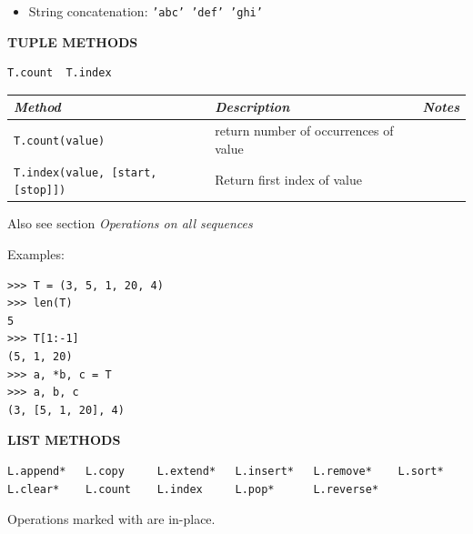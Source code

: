 \documentclass[9pt,a4wide]{extarticle}
\begin{document}
\medskip

\begin{itemize}
\item String concatenation: {\tt 'abc' 'def' 'ghi'}
\end{itemize}




\bigskip
{\LARGE\bf TUPLE METHODS}

\begin{verbatim}
T.count  T.index 
\end{verbatim}

\begin{supertabular}{|l|p{9cm}|c|}\hline
{\em Method}  & {\em Description}     &  {\em Notes}       \\ \hline\hline

{\tt T.count(value)}  &  return number of occurrences of value          &                \\ \hline

{\tt T.index(value, [start, [stop]])}  &  Return first index of value   &    \\ \hline

\end{supertabular}

\bigskip

Also see section {\em Operations on all sequences}

\medskip

Examples:

\begin{verbatim}
>>> T = (3, 5, 1, 20, 4)
>>> len(T)
5
>>> T[1:-1]
(5, 1, 20)
>>> a, *b, c = T
>>> a, b, c
(3, [5, 1, 20], 4)
\end{verbatim}



\bigskip
{\LARGE\bf LIST METHODS}


\begin{verbatim}
L.append*   L.copy     L.extend*   L.insert*   L.remove*    L.sort*    
L.clear*    L.count    L.index     L.pop*      L.reverse* 
\end{verbatim}

Operations marked with {\tt *} are in-place.

\bigskip
\end{document}
